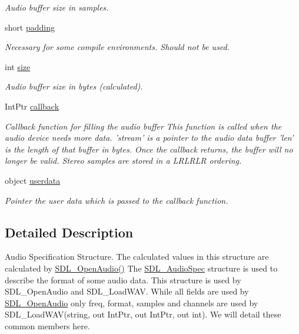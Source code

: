 \begin{DoxyCompactItemize}
\begin{DoxyCompactList}\small\item\em Audio buffer size in samples. \item\end{DoxyCompactList}\item 
short \hyperlink{struct_tao_1_1_sdl_1_1_sdl_1_1_s_d_l___audio_spec_a8aaeb1676ee76d59b18b8f15d0645082}{padding}
\begin{DoxyCompactList}\small\item\em Necessary for some compile environments. Should not be used. \item\end{DoxyCompactList}\item 
int \hyperlink{struct_tao_1_1_sdl_1_1_sdl_1_1_s_d_l___audio_spec_a8cd766ffb23b757b6d0db6e490d664df}{size}
\begin{DoxyCompactList}\small\item\em Audio buffer size in bytes (calculated). \item\end{DoxyCompactList}\item 
IntPtr \hyperlink{struct_tao_1_1_sdl_1_1_sdl_1_1_s_d_l___audio_spec_a7c40815285a5f088ef41c0d80c01bac6}{callback}
\begin{DoxyCompactList}\small\item\em Callback function for filling the audio buffer This function is called when the audio device needs more data. 'stream' is a pointer to the audio data buffer 'len' is the length of that buffer in bytes. Once the callback returns, the buffer will no longer be valid. Stereo samples are stored in a LRLRLR ordering. \item\end{DoxyCompactList}\item 
object \hyperlink{struct_tao_1_1_sdl_1_1_sdl_1_1_s_d_l___audio_spec_a988e76da152a5e29ddd6c2bd17458b8c}{userdata}
\begin{DoxyCompactList}\small\item\em Pointer the user data which is passed to the callback function. \item\end{DoxyCompactList}\end{DoxyCompactItemize}


\subsection{Detailed Description}
Audio Specification Structure. The calculated values in this structure are calculated by \hyperlink{_sdl_8cs_ad374c9d61753113b30c8c4b96295ff3b}{SDL\_\-OpenAudio()} The \hyperlink{struct_tao_1_1_sdl_1_1_sdl_1_1_s_d_l___audio_spec}{SDL\_\-AudioSpec} structure is used to describe the format of some audio data. This structure is used by SDL\_\-OpenAudio and SDL\_\-LoadWAV. While all fields are used by \hyperlink{_sdl_8cs_ad374c9d61753113b30c8c4b96295ff3b}{SDL\_\-OpenAudio} only freq, format, samples and channels are used by SDL\_\-LoadWAV(string, out IntPtr, out IntPtr, out int). We will detail these common members here. 

